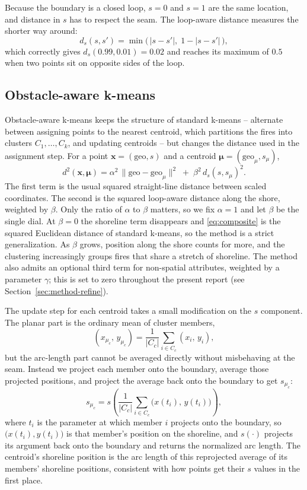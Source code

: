 \documentclass[11pt]{article}
\begin{document}
Because the boundary is a closed loop, $s = 0$ and $s = 1$ are the same location, and distance in $s$ has to respect the seam. The loop-aware distance measures the shorter way around:
\begin{equation}
d_s(s, s') = \min\!\big(\, |s - s'|, \; 1 - |s - s'| \,\big),
\label{eq:loop-distance}
\end{equation}
which correctly gives $d_s(0.99, 0.01) = 0.02$ and reaches its maximum of $0.5$ when two points sit on opposite sides of the loop.

\subsection{Obstacle-aware k-means}
 
Obstacle-aware k-means keeps the structure of standard k-means -- alternate between assigning points to the nearest centroid, which partitions the
fires into clusters $C_1, \dots, C_k$, and updating centroids -- but changes the distance used in the assignment step. For a point $\mathbf{x} = (\text{geo}, s)$ and a centroid $\boldsymbol{\mu} = (\text{geo}_\mu, s_\mu)$,
\begin{equation}
d^2(\mathbf{x}, \boldsymbol{\mu})
= \alpha^2 \, \big\lVert \text{geo} - \text{geo}_\mu \big\rVert^2
\; + \; \beta^2 \, d_s(s, s_\mu)^2 .
\label{eq:composite}
\end{equation}
The first term is the usual squared straight-line distance between scaled coordinates. The second is the squared loop-aware distance along the shore, weighted by $\beta$. Only the ratio of $\alpha$ to $\beta$ matters, so we fix $\alpha = 1$ and let $\beta$ be the single dial. At $\beta = 0$ the shoreline term disappears and \eqref{eq:composite} is the squared Euclidean distance of standard k-means, so the method is a strict generalization. As $\beta$ grows, position along the shore counts for more, and the clustering increasingly groups fires that share a stretch of shoreline. The method also admits an optional third term for non-spatial attributes, weighted by a parameter $\gamma$; this is set to zero throughout the present report (see Section~\ref{sec:method-refine}).
 
The update step for each centroid takes a small modification on the $s$ component. The planar part is the ordinary mean of cluster members,
\[
(x_{\mu_c},\, y_{\mu_c}) = \frac{1}{|C_c|} \sum_{i \in C_c} (x_i,\, y_i),
\]
but the arc-length part cannot be averaged directly without misbehaving at the seam. Instead we project each member onto the boundary, average those projected
positions, and project the average back onto the boundary to get $s_{\mu_c}$:
\[
s_{\mu_c} = s\!\left( \frac{1}{|C_c|} \sum_{i \in C_c} \big( x(t_i),\, y(t_i) \big) \right),
\]
where $t_i$ is the parameter at which member $i$ projects onto the boundary, so
$\big(x(t_i), y(t_i)\big)$ is that member's position on the shoreline, and $s(\cdot)$
projects its argument back onto the boundary and returns the normalized arc length.
The centroid's shoreline position is the arc length of this reprojected average of
its members' shoreline positions, consistent with how points get their $s$ values in
the first place.
\end{document}
